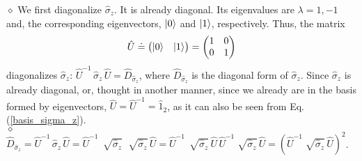 \documentclass[11pt]{article}
\numberwithin{equation}{section} %
\numberwithin{figure}{section} %
\begin{document}
\begin{appendices}
$\diamond$ We first diagonalize $\hat{\sigma}_z$. It is already diagonal. Its eigenvalues are $\lambda=1,-1$ and, the corresponding eigenvectors, $\ket{0}$ and $\ket{1}$, respectively. Thus, the matrix 
\begin{equation} \label{basis_sigma_z}
\hat{U}\doteq\begin{pmatrix} \ket{0} & \ket{1}\end{pmatrix} = \begin{pmatrix} 1&0\\0&1 \end{pmatrix}
\end{equation}
diagonalizes $\hat{\sigma}_z$: $\hat{U}^{-1}\,\hat{\sigma}_z\,\hat{U}=\hat{D}_{\hat{\sigma}_z}$, where $\hat{D}_{\hat{\sigma}_z}$ is the diagonal form of $\hat{\sigma}_z$. Since $\hat{\sigma}_z$ is already diagonal, or, thought in another manner, since we already are in the basis formed by eigenvectors, $\hat{U}=\hat{U}^{-1}=\hat{1}_2$, as it can also be seen from Eq. (\ref{basis_sigma_z}).\\

$\diamond$ $\hat{D}_{\hat{\sigma}_z}=\hat{U}^{-1}\,\hat{\sigma}_z\,\hat{U}= \hat{U}^{-1}\,\sqrt[]{\hat{\sigma}_z}\,\,\sqrt[]{\hat{\sigma}_z}\,\hat{U} = \hat{U}^{-1}\,\sqrt[]{\hat{\sigma}_z}\,\hat{U}\,\hat{U}^{-1}\sqrt[]{\hat{\sigma}_z}\,\hat{U} = (\hat{U}^{-1}\sqrt[]{\hat{\sigma}_z}\,\hat{U})^2$. 


\end{appendices}
\end{document}

